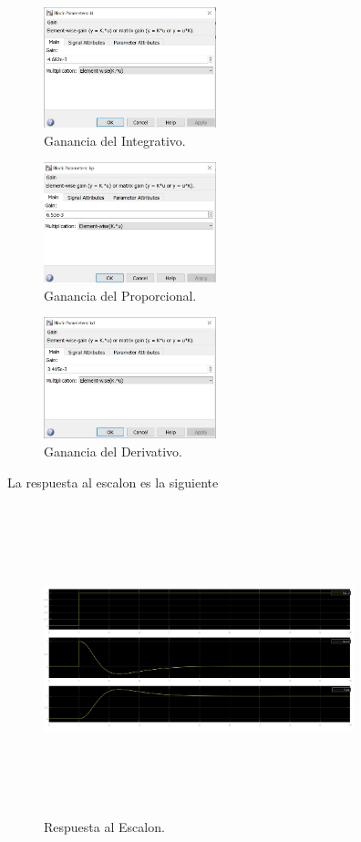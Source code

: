 \documentclass[a4paper]{IEEEtran} %
\begin{document}
\vspace{10mm}

\begin{figure}[h]
    \centering
        \includegraphics[width=5cm]{images/10}
        \caption{Ganancia del Integrativo.}
        \label{fig:config2}
\end{figure}

\begin{figure}[h]
    \centering
        \includegraphics[width=5cm]{images/11}
        \caption{Ganancia del Proporcional.}
        \label{fig:config3}
\end{figure}

\begin{figure}[h]
    \centering
        \includegraphics[width=5cm]{images/12}
        \caption{Ganancia del Derivativo.}
        \label{fig:config4}
\end{figure}
\vspace{20mm}
La respuesta al escalon es la siguiente
\begin{figure}[h]
    \centering
        \includegraphics[width=9cm, height=9cm]{images/13}
        \caption{Respuesta al Escalon.}
        \label{fig:result}
\end{figure}
\end{document}
